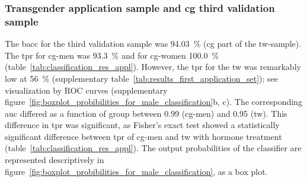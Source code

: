 \documentclass{article}
\begin{document}
    \subsubsection{Transgender application sample and \acl{cg} third validation sample}
    The \ac{bacc} for the third validation sample was \SI{94.03}{\percent} (\ac{cg} part of the \ac{tw}-sample). The \ac{tpr} for \ac{cg}-men was \SI{93.3}{\percent} and for \ac{cg}-women \SI{100.0}{\percent} (table~\ref{tab:classification_res_appl}). However, the \ac{tpr} for the \ac{tw} was remarkably low at \SI{56}{\percent} (supplementary table~\ref{tab:results_first_application_set}); see visualization by ROC curves (supplementary figure~\ref{fig:boxplot_probibilities_for_male_classification}b, c). The corresponding \ac{auc} differed as a function of group between 0.99 (\ac{cg}-men) and 0.95 (\ac{tw}). This difference in \ac{tpr} was significant, as Fisher's exact test showed a statistically significant difference between \ac{tpr} of \ac{cg}-men and \ac{tw} with hormone treatment (table~\ref{tab:classification_res_appl}). The output probabilities of the classifier are represented descriptively in figure~\ref{fig:boxplot_probibilities_for_male_classification}, as a box plot.
\end{document}
